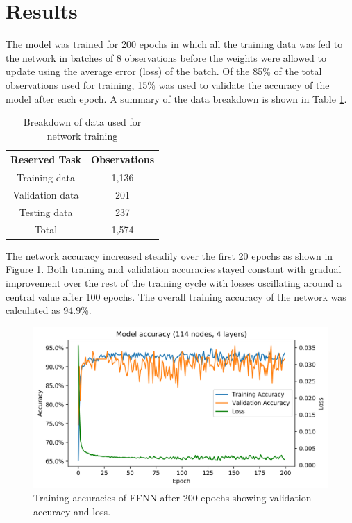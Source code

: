 \documentclass[twoside,twocolumn]{article}
\begin{document}
	
	\section{Results}
	The model was trained for 200 epochs in which all the training data was fed to the network in batches of 8 observations before the weights were allowed to update using the average error (loss) of the batch. Of the 85\% of the total observations used for training, 15\% was used to validate the accuracy of the model after each epoch. A summary of the data breakdown is shown in Table \ref{tab:data}.
	
	\begin{table}[]
		\centering
		\caption{Breakdown of data used for network training }
		\label{tab:data}
		\begin{tabular}{@{}cc@{}}
			\toprule
			\textbf{Reserved Task} & \textbf{Observations} \\ \midrule
			Training data & 1,136 \\
			Validation data & 201 \\
			Testing data & 237 \\ 
			Total & 1,574 \\ \bottomrule
		\end{tabular}
	\end{table}
	
	The network accuracy increased steadily over the first 20 epochs as shown in Figure \ref{fig:ffnn_training}. Both training and validation accuracies stayed constant with gradual improvement over the rest of the training cycle with losses oscillating around a central value after 100 epochs. The overall training accuracy of the network was calculated as 94.9\%.
	
	\begin{figure}[!ht]
		\centering
		\includegraphics[width=.9\textwidth]{images/training_acc_loss.png}  
		\caption{Training accuracies of FFNN after 200 epochs showing validation accuracy and loss.}
		\label{fig:ffnn_training}
	\end{figure}
\end{document}
